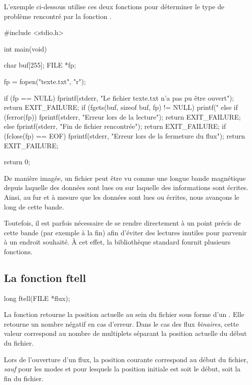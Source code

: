 L'exemple ci-dessous utilise ces deux fonctions pour déterminer le type
de problème rencontré par la fonction .

\begin{C}
#include <stdio.h>

int main(void)
{
    char buf[255];
    FILE *fp;

    fp = fopen("texte.txt", "r");

    if (fp == NULL)
    {
        fprintf(stderr, "Le fichier texte.txt n'a pas pu être ouvert\n");
        return EXIT_FAILURE;
    }
    if (fgets(buf, sizeof buf, fp) != NULL)
        printf("%
    else if (ferror(fp))
    {
        fprintf(stderr, "Erreur lors de la lecture\n");
        return EXIT_FAILURE;
    }
    else
    {
        fprintf(stderr, "Fin de fichier rencontrée\n");
        return EXIT_FAILURE;
    }
    if (fclose(fp) == EOF)
    {
        fprintf(stderr, "Erreur lors de la fermeture du flux\n");
        return EXIT_FAILURE;        
    }

    return 0;
}
\end{C}

De manière imagée, un fichier peut être vu comme une longue bande
magnétique depuis laquelle des données sont lues ou sur laquelle des
informations sont écrites. Ainsi, au fur et à mesure que les données
sont lues ou écrites, nous avançons le long de cette bande.

Toutefois, il est parfois nécessaire de se rendre directement à un point
précis de cette bande (par exemple à la fin) afin d'éviter des lectures
inutiles pour parvenir à un endroit souhaité. À cet effet, la
bibliothèque standard fournit plusieurs fonctions.

\subsection{La fonction ftell}
\label{la-fonction-ftell}

\begin{C}
long ftell(FILE *flux);
\end{C}

La fonction  retourne la position actuelle au sein du
fichier sous forme d'un . Elle retourne un nombre négatif
en cas d'erreur. Dans le cas des flux \emph{binaires}, cette valeur
correspond au nombre de multiplets séparant la position actuelle du
début du fichier.

\begin{attentionbox}
  Lors de l'ouverture d'un flux, la
position courante correspond au début du fichier, \emph{sauf} pour les
modes  et  pour lesquels la position initiale est
soit le début, soit la fin du fichier.
\end{attentionbox}


